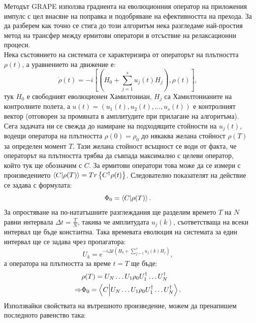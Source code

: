     Методът GRAPE \cite{motzoi2009simple} използва градиента на еволюционния оператор на приложения импулс с цел внасяне на поправка и подобряване на ефективността на прехода.
    За да разберем как точно се стига до този алгоритъм нека разгледаме най-простия метод на трансфер между ермитови оператори в отсъствие на релаксационни процеси.\\
    Нека състоянието на системата се характеризира от операторът на плътността $\rho(t)$, а уравнението на движение е:
    \begin{equation}
        \dot{\rho}(t) = -\textit{i}\left[\left(H_0 + \sum_{j=1}^s u_j(t)H_j\right),\rho(t)\right],
    \end{equation}
    тук $H_0$ е свободният еволюционен Хамилтониан, $H_j$ са Хамилтонианите на контролните полета, а $u(t) = (u_1(t), u_2(t), \dots , u_s(t))$ е контролният вектор (отговорен за промяната в амплитудите при прилагане на алгоритъма). Сега задачата ни се свежда до намиране на
    подходящите стойности на $u_j(t)$, водещи оператора на плътността $\rho(0) = \rho_0$ до някаква желана стойност $\rho(T)$ за определен момент $T$. Тази желана стойност всъщност се води от факта, че операторът на плътността трябва да съвпада максимално с целеви оператор, който
    тук ще обозначим с $C$.
    За ермитови оператори това може да се измери с произведението $\braket{C}{\rho(T)} = Tr\left\{C^\dagger \rho(t)\right\}$. Следователно показателят на действие се задава с формулата:
    \begin{equation}
        \Phi_0 = \braket{C}{\rho(T)}.
    \end{equation}
    За опростяване на по-нататъшните разглеждания ще разделим времето $T$ на $N$ равни интервала $\Delta t=\frac{T}{N}$, такива че амплитудата $u_j(k)$, съответстваща на всеки интервал ще бъде константна. Така времевата еволюция на системата за един интервал ще се задава чрез пропагатора:
    \begin{equation} \label{4.6}
        U_k = e^{-\textit{i}\Delta t \left(H_0 + \sum_{j=1}^s u_j(k)H_j \right)},
    \end{equation}
    а оператора на плътността за време $t=T$ ще бъде:
    \begin{align}
        & \rho(T) = U_N \dots U_1 \rho_0 U_1^\dagger \dots U_N^\dagger\\
        \Rightarrow &\Phi_0 = \braket{C}{U_N \dots U_1 \rho_0 U_1^\dagger \dots U_N^\dagger}.
    \end{align}
    Използвайки свойствата на вътрешното произведение, можем да пренапишем последното равенство така:
